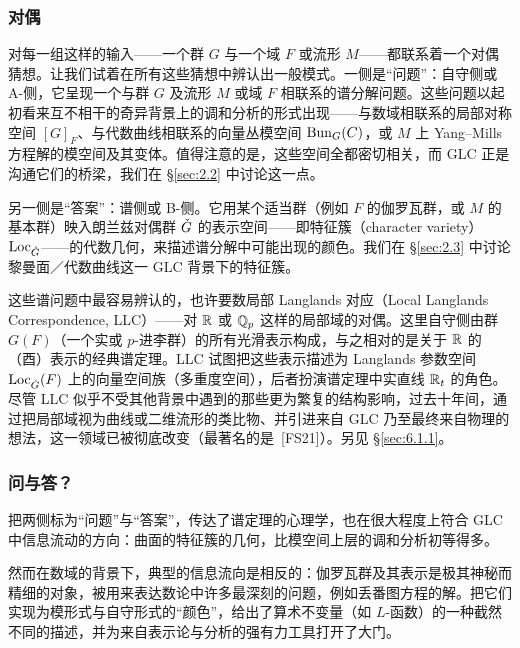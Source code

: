 \subsubsection{对偶}\label{sec:1.4.3}

对每一组这样的输入——一个群 $G$ 与一个域 $F$ 或流形 $M$——都联系着一个对偶猜想。让我们试着在所有这些猜想中辨认出一般模式。一侧是“问题”：自守侧或 A-侧，它呈现一个与群 $G$ 及流形 $M$ 或域 $F$ 相联系的谱分解问题。这些问题以起初看来互不相干的奇异背景上的调和分析的形式出现——与数域相联系的局部对称空间 $[G]_{F}$、与代数曲线相联系的向量丛模空间 $\operatorname{Bun}_{G}(C)$，或 $M$ 上 Yang–Mills 方程解的模空间及其变体。值得注意的是，这些空间全都密切相关，而 GLC 正是沟通它们的桥梁，我们在 \S\ref{sec:2.2} 中讨论这一点。

另一侧是“答案”：谱侧或 B-侧。它用某个适当群（例如 $F$ 的伽罗瓦群，或 $M$ 的基本群）映入朗兰兹对偶群 $\check{G}$ 的表示空间——即特征簇（character variety）$\operatorname{Loc}_{\check{G}}$——的代数几何，来描述谱分解中可能出现的颜色。我们在 \S\ref{sec:2.3} 中讨论黎曼面／代数曲线这一 GLC 背景下的特征簇。

这些谱问题中最容易辨认的，也许要数局部 Langlands 对应（Local Langlands Correspondence, LLC）——对 $\mathbb{R}$ 或 $\mathbb{Q}_{p}$ 这样的局部域的对偶。这里自守侧由群 $G(F)$（一个实或 $p$-进李群）的所有光滑表示构成，与之相对的是关于 $\mathbb{R}$ 的（酉）表示的经典谱定理。LLC 试图把这些表示描述为 Langlands 参数空间 $\operatorname{Loc}_{\check{G}}(F)$ 上的向量空间族（多重度空间），后者扮演谱定理中实直线 $\mathbb{R}_{t}$ 的角色。尽管 LLC 似乎不受其他背景中遇到的那些更为繁复的结构影响，过去十年间，通过把局部域视为曲线或二维流形的类比物、并引进来自 GLC 乃至最终来自物理的想法，这一领域已被彻底改变（最著名的是~[FS21]）。另见 \S\ref{sec:6.1.1}。

\subsubsection{问与答？}\label{sec:1.4.4}

把两侧标为“问题”与“答案”，传达了谱定理的心理学，也在很大程度上符合 GLC 中信息流动的方向：曲面的特征簇的几何，比模空间上层的调和分析初等得多。

然而在数域的背景下，典型的信息流向是相反的：伽罗瓦群及其表示是极其神秘而精细的对象，被用来表达数论中许多最深刻的问题，例如丢番图方程的解。把它们实现为模形式与自守形式的“颜色”，给出了算术不变量（如 $L$-函数）的一种截然不同的描述，并为来自表示论与分析的强有力工具打开了大门。

